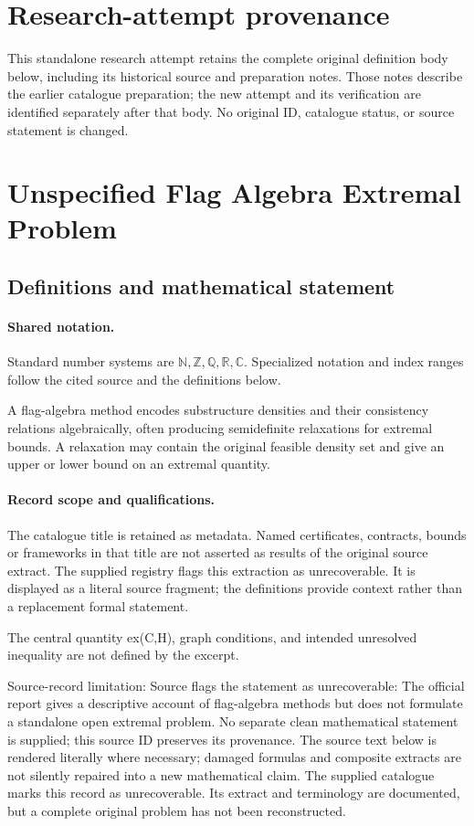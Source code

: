 \documentclass[11pt]{article}
\begin{document}
\section*{Research-attempt provenance}
This standalone research attempt retains the complete original definition body below,
including its historical source and preparation notes. Those notes describe the
earlier catalogue preparation; the new attempt and its verification are identified
separately after that body. No original ID, catalogue status, or source statement is changed.

\section{Unspecified Flag Algebra Extremal Problem}\label{statement}

\subsection{Definitions and mathematical statement}

\paragraph{Shared notation.}Standard number systems are $\mathbb N,\mathbb Z,\mathbb Q,\mathbb R,\mathbb C$. Specialized notation and index ranges follow the cited source and the definitions below.


A flag-algebra method encodes substructure densities and their consistency relations algebraically, often producing semidefinite relaxations for extremal bounds. A relaxation may contain the original feasible density set and give an upper or lower bound on an extremal quantity.
\paragraph{Record scope and qualifications.}
The catalogue title is retained as metadata. Named certificates, contracts, bounds or frameworks in that title are not asserted as results of the original source extract.
The supplied registry flags this extraction as unrecoverable. It is displayed as a literal source fragment; the definitions provide context rather than a replacement formal statement.

The central quantity ex(C,H), graph conditions, and intended unresolved inequality are not defined by the excerpt.

Source-record limitation: Source flags the statement as unrecoverable: The official report gives a descriptive account of flag-algebra methods but does not formulate a standalone open extremal problem. No separate clean mathematical statement is supplied; this source ID preserves its provenance.
The source text below is rendered literally where necessary; damaged formulas and composite extracts are not silently repaired into a new mathematical claim.
The supplied catalogue marks this record as unrecoverable. Its extract and terminology are documented, but a complete original problem has not been reconstructed.
\end{document}
